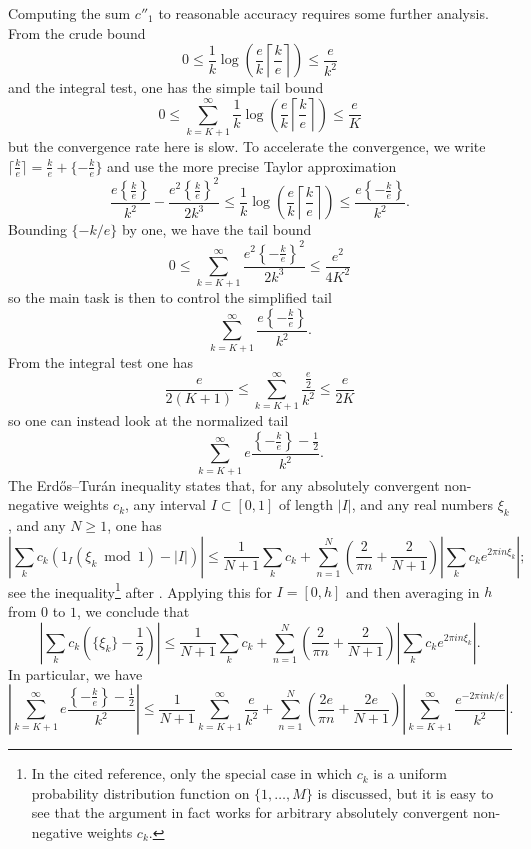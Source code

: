 \documentclass[12pt,a4paper,reqno]{amsart}
\numberwithin{equation}{section}
\theoremstyle{plain}
\theoremstyle{definition}
\renewcommand{\mod}{\bmod}
\begin{document}
Computing the sum $c''_1$ to reasonable accuracy requires some further analysis.  From the crude bound
$$0 \leq \frac{1}{k} \log\left(\frac{e}{k} \left\lceil \frac{k}{e} \right\rceil\right) \leq \frac{e}{k^2}$$
and the integral test, one has the simple tail bound
$$ 0 \leq \sum_{k=K+1}^\infty \frac{1}{k} \log\left(\frac{e}{k} \left\lceil \frac{k}{e} \right\rceil\right) \leq \frac{e}{K}$$
but the convergence rate here is slow.  To accelerate the convergence, we write $\lceil\frac{k}{e} \rceil = \frac{k}{e} + \{-\frac{k}{e}\}$ and use the more precise Taylor approximation
$$ \frac{e \left\{\frac{k}{e}\right\}}{k^2} - \frac{e^2 \left\{\frac{k}{e}\right\}^2}{2k^3} 
\leq \frac{1}{k} \log\left(\frac{e}{k} \left\lceil \frac{k}{e} \right\rceil\right) \leq \frac{e \left\{-\frac{k}{e}\right\}}{k^2}.$$
Bounding $\{-k/e\}$ by one, we have the tail bound
$$ 0 \leq \sum_{k=K+1}^\infty \frac{e^2 \left\{-\frac{k}{e}\right\}^2}{2k^3} \leq \frac{e^2}{4K^2}$$
so the main task is then to control the simplified tail
$$ \sum_{k=K+1}^\infty \frac{e\left\{-\frac{k}{e}\right\}}{k^2}.$$
From the integral test one has
$$ \frac{e}{2(K+1)} \leq \sum_{k=K+1}^\infty \frac{\frac{e}{2}}{k^2} \leq \frac{e}{2K}$$
so one can instead look at the normalized tail
$$ \sum_{k=K+1}^\infty e\frac{\left\{-\frac{k}{e}\right\}-\frac{1}{2}}{k^2}.$$
The Erd\H{o}s--Tur\'an inequality states that, for any absolutely convergent non-negative weights $c_k$, any interval $I \subset [0,1]$ of length $|I|$, and any real numbers $\xi_k$, and any $N \geq 1$, one has
$$ \left|\sum_k c_k (1_I(\xi_k \mod 1) - |I|)\right| \leq \frac{1}{N+1} \sum_k c_k + \sum_{n=1}^N \left(\frac{2}{\pi n} + \frac{2}{N+1}\right) \left|\sum_k c_k e^{2\pi i n \xi_k}\right|;$$
see the inequality\footnote{In the cited reference, only the special case in which $c_k$ is a uniform probability distribution function on $\{1,\dots,M\}$ is discussed, but it is easy to see that the argument in fact works for arbitrary absolutely convergent non-negative weights $c_k$.} after \cite[Theorem 20]{vaaler}.  Applying this for $I = [0,h]$ and then averaging in $h$ from $0$ to $1$, we conclude that
$$ \left|\sum_k c_k \left(\{\xi_k\}-\frac{1}{2}\right)\right| \leq \frac{1}{N+1} \sum_k c_k + \sum_{n=1}^N \left(\frac{2}{\pi n} + \frac{2}{N+1}\right) \left|\sum_k c_k e^{2\pi i n \xi_k}\right|.$$
In particular, we have
$$ \left| \sum_{k=K+1}^\infty e\frac{\left\{-\frac{k}{e}\right\}-\frac{1}{2}}{k^2}\right| \leq \frac{1}{N+1} \sum_{k=K+1}^\infty \frac{e}{k^2}
+ \sum_{n=1}^N \left(\frac{2e}{\pi n} + \frac{2e}{N+1}\right) \left|\sum_{k=K+1}^\infty \frac{e^{-2\pi i n k/e}}{k^2}\right|.
$$
\end{document}
